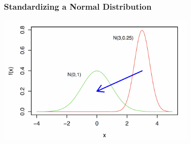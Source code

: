 \documentclass[12pt]{beamer}
\begin{document}
\begin{frame}
	\frametitle{Standardizing a Normal Distribution}
	\centering
\includegraphics[width=10cm]{normal5.png}
\end{frame}
\end{document}
